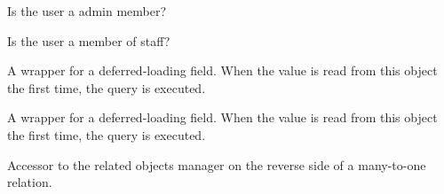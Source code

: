 \documentclass[letterpaper,10pt,english]{sphinxmanual}
\begin{document}
\begin{fulllineitems}
\begin{fulllineitems}
\end{fulllineitems}


\begin{fulllineitems}
\label{\detokenize{QuChemPedIA.models:QuChemPedIA.models.UserModel.Utilisateur.is_admin}}
Is the user a admin member?

\end{fulllineitems}


\begin{fulllineitems}
\label{\detokenize{QuChemPedIA.models:QuChemPedIA.models.UserModel.Utilisateur.is_staff}}
Is the user a member of staff?

\end{fulllineitems}


\begin{fulllineitems}
\label{\detokenize{QuChemPedIA.models:QuChemPedIA.models.UserModel.Utilisateur.last_date_upload}}
A wrapper for a deferred-loading field. When the value is read from this
object the first time, the query is executed.

\end{fulllineitems}


\begin{fulllineitems}
\label{\detokenize{QuChemPedIA.models:QuChemPedIA.models.UserModel.Utilisateur.last_name}}
A wrapper for a deferred-loading field. When the value is read from this
object the first time, the query is executed.

\end{fulllineitems}


\begin{fulllineitems}
\label{\detokenize{QuChemPedIA.models:QuChemPedIA.models.UserModel.Utilisateur.logentry_set}}
Accessor to the related objects manager on the reverse side of a
many-to-one relation.


\end{fulllineitems}
\end{fulllineitems}
\end{document}
